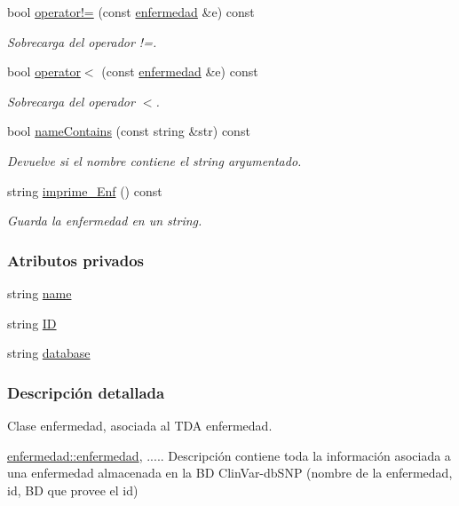 \begin{DoxyCompactItemize}
bool \hyperlink{classenfermedad_a9315018e351b2c435129eaccfab97c7f}{operator!=} (const \hyperlink{classenfermedad}{enfermedad} \&e) const
\begin{DoxyCompactList}\small\item\em Sobrecarga del operador !=. \end{DoxyCompactList}\item 
bool \hyperlink{classenfermedad_a0b532e9e14c36ca4431cf50620c871ed}{operator$<$} (const \hyperlink{classenfermedad}{enfermedad} \&e) const
\begin{DoxyCompactList}\small\item\em Sobrecarga del operador $<$. \end{DoxyCompactList}\item 
bool \hyperlink{classenfermedad_a430d035077d6acff0b1ddbd07c2ff205}{name\+Contains} (const string \&str) const
\begin{DoxyCompactList}\small\item\em Devuelve si el nombre contiene el string argumentado. \end{DoxyCompactList}\item 
string \hyperlink{classenfermedad_a125bc2a3705be349859825b230b2652c}{imprime\+\_\+\+Enf} () const
\begin{DoxyCompactList}\small\item\em Guarda la enfermedad en un string. \end{DoxyCompactList}\end{DoxyCompactItemize}
\subsubsection*{Atributos privados}
\begin{DoxyCompactItemize}
\item 
string \hyperlink{classenfermedad_ad7c4204057028a73bde6022678c6813e}{name}
\item 
string \hyperlink{classenfermedad_a689cdbd469ecc28e045bda2f62a229d2}{ID}
\item 
string \hyperlink{classenfermedad_a3684b7ec850d4c9357dd21bdd5e02803}{database}
\end{DoxyCompactItemize}


\subsubsection{Descripción detallada}
Clase enfermedad, asociada al T\+DA enfermedad. 

\hyperlink{classenfermedad_a60eb5e620b0bf9a53d4f0980031aeefd}{enfermedad\+::enfermedad}, ..... Descripción contiene toda la información asociada a una enfermedad almacenada en la BD Clin\+Var-\/db\+S\+NP (nombre de la enfermedad, id, BD que provee el id)

